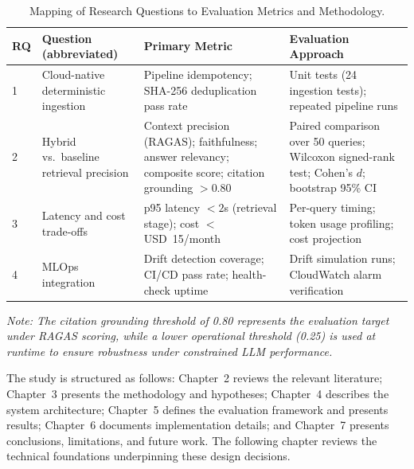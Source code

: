 \begin{table}[H]
\caption{Mapping of Research Questions to Evaluation Metrics and Methodology.}
\label{tab:rq_map}
\centering
\begin{tabular}{p{0.5cm}p{4.0cm}p{3.5cm}p{4.0cm}}
\toprule
\textbf{RQ} & \textbf{Question (abbreviated)} & \textbf{Primary Metric} & \textbf{Evaluation Approach} \\
\midrule
1 & Cloud-native deterministic ingestion & Pipeline idempotency; SHA-256 deduplication pass rate & Unit tests (24 ingestion tests); repeated pipeline runs \\[4pt]
2 & Hybrid vs.\ baseline retrieval precision & Context precision (RAGAS); faithfulness; answer relevancy; composite score; citation grounding $> 0.80$ & Paired comparison over 50 queries; Wilcoxon signed-rank test; Cohen's $d$; bootstrap 95\% CI \\[4pt]
3 & Latency and cost trade-offs & p95 latency $< 2$s (retrieval stage); cost $<$ USD~15/month & Per-query timing; token usage profiling; cost projection \\[4pt]
4 & MLOps integration & Drift detection coverage; CI/CD pass rate; health-check uptime & Drift simulation runs; CloudWatch alarm verification \\
\bottomrule
\end{tabular}
\medskip
\noindent\small\textit{Note: The citation grounding threshold of 0.80 represents the evaluation target under RAGAS scoring, while a lower operational threshold (0.25) is used at runtime to ensure robustness under constrained LLM performance.}
\end{table}

\medskip
\noindent The study is structured as follows: Chapter~2 reviews the relevant literature; Chapter~3 presents the methodology and hypotheses; Chapter~4 describes the system architecture; Chapter~5 defines the evaluation framework and presents results; Chapter~6 documents implementation details; and Chapter~7 presents conclusions, limitations, and future work. The following chapter reviews the technical foundations underpinning these design decisions.
